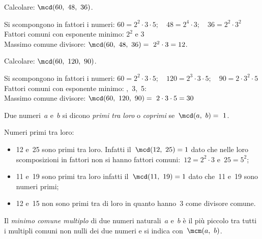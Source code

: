 
\begin{esempio}{}{}
Calcolare: \quad \(\mcd(60,~48,~36)\).

Si scompongono in fattori i numeri: \quad
\(60 = 2^2 \cdot 3 \cdot 5; 
  \quad 48 = 2^4 \cdot 3; 
  \quad 36 = 2^2 \cdot 3^2\)\\
Fattori comuni con esponente minimo: \quad \(2^2\) e \(3\) \\
Massimo comune divisore: \quad \(\mcd(60,~48,~36)=~2^2 \cdot 3 = 12\).
\end{esempio}

\begin{esempio}{}{}
Calcolare: \quad \(\mcd(60,~120,~90)\).

Si scompongono in fattori i numeri:\quad 
\(60 = 2^2 \cdot 3 \cdot 5; 
  \quad 120 = 2^3 \cdot 3 \cdot 5; 
  \quad 90 = 2 \cdot 3^2 \cdot 5\)\\
Fattori comuni con esponente minimo: ,~3,~5:\\ 
Massimo comune divisore: \quad
\(\mcd(60,~120,~90)=~2 \cdot3 \cdot 5 = 30\)
\end{esempio}

\begin{definizione}{}{}
Due numeri~\(a\) e~\(b\) si dicono \emph{primi tra loro} o \emph{coprimi} 
se~\(\mcd(a,~b) =~1\).
\end{definizione}

\begin{esempio}{}{}
Numeri primi tra loro:
\begin{itemize} [noitemsep]
\item 12 e~25 sono primi tra loro. Infatti il~\(\mcd(12,~25)=1\) dato che 
nelle loro scomposizioni in fattori non si hanno fattori 
comuni:~\(12 =2^2\cdot3\) e~\(25=5^2\);
\item 11 e~19 sono primi tra loro infatti il~\(\mcd(11,~19)=1\) dato che~11 
e~19 sono numeri primi;
\item 12 e~15 non sono primi tra di loro in quanto hanno~3 come divisore 
comune.
\end{itemize}
\end{esempio}

\begin{definizione}{}{}
Il \emph{minimo comune multiplo} di due numeri naturali~\(a\) e~\(b\) è il più
piccolo tra tutti i multipli comuni non nulli dei due numeri 
e si indica con~\(\mcm(a,~b)\).
\end{definizione}

